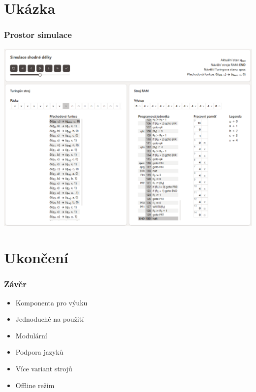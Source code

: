 \documentclass{beamer}
\begin{document}
\section{Ukázka}
\begin{frame}
	\frametitle{Prostor simulace}
    \vspace{-2.6mm}
    \begin{center}
        \includegraphics[height=0.913\textheight]{fig/obr4.png}
    \end{center}
\end{frame}

\section{Ukončení}
\begin{frame}
	\frametitle{Závěr}
	\begin{itemize}
		\item<1-> Komponenta pro výuku
	\end{itemize}
    \bigskip
    \begin{itemize}
		\item<1-> Jednoduché na použití
        \item<1-> Modulární
	\end{itemize}
    \bigskip
    \begin{itemize}
		\item<1-> Podpora jazyků
        \item<1-> Více variant strojů
        \item<1-> Offline režim
	\end{itemize}
    \bigskip
    \bigskip
\end{frame}
\end{document}
